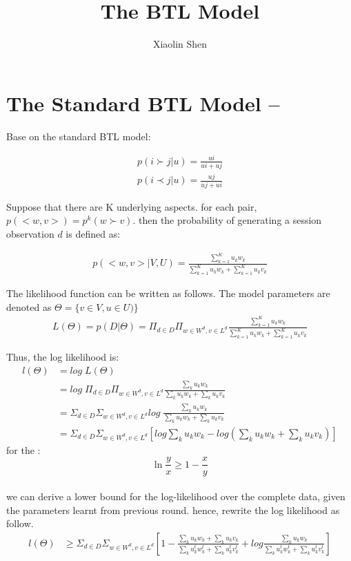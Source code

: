 \documentclass{article}
\title{The BTL Model}
\author{Xiaolin Shen}
\begin{document}
\maketitle


\section{The Standard BTL Model --}
Base on the standard BTL model:

\begin{align*}
	p(i \succ j |u)=\frac{ui}{ui+ uj} \\
	p(i \prec j |u)=\frac{uj}{uj+ ui}
\end{align*}

 Suppose that there are K underlying aspects. for each pair, $p(<w,v>) = p^k(w\succ v) $. then the probability of generating a session observation $d$ is defined as:

\begin{align}
p(<w,v>|V,U)
= \frac{\sum_{k=1}^{K} u_k w_k}{\sum_{k=1}^{K} u_k w_k+ \sum_{k=1}^{K} u_k v_k}
\end{align}

The likelihood function can be written as follows. The model parameters are denoted as $ \Theta = \{ v \in V ,u \in U ) \}$
\begin{align}
L(\Theta)=p(D|\Theta)
=\Pi_{d \in D} \Pi_{w\in W^d, v\in L^d} \frac{\sum_{k=1}^{K} u_k w_k}{\sum_{k=1}^{K} u_k w_k+ \sum_{k=1}^{K} u_k v_k}
\end{align}

Thus, the log likelihood is:
\begin{align}
l(\Theta) &= log \; L(\Theta) \\
& =log \; \Pi_{d \in D} \Pi_{w\in W^d, v\in L^d} \frac{\sum_k u_k w_k}{\sum_k u_k w_k+ \sum_k u_k v_k}\\ \nonumber
& =\Sigma_{d \in D} \Sigma_{w\in W^d, v\in L^d} log \;  \frac{\sum_k u_k w_k}{\sum_k u_k w_k+ \sum_k u_k v_k}\\ \nonumber
& =\Sigma_{d \in D} \Sigma_{w\in W^d, v\in L^d} [log \sum_k u_k w_k-log (\sum_k u_k w_k+ \sum_k u_k v_k)]
\end{align}
for the :
\begin{equation*}
\ln \frac{y}{x} \geq 1- \frac{x}{y}
\end{equation*}\\
we can derive a lower bound for the log-likelihood over the complete data, given the parameters learnt from previous round.
hence, rewrite the log likelihood as follow.
\begin{align}
l(\Theta)
& \geq\Sigma_{d \in D} \Sigma_{w\in W^d, v\in L^d} [1- \frac{\sum_k u_k w_k+ \sum_k u_k v_k}{\sum_k u_k^t w_k^t + \sum_k u_k^t v_k^t} + log \frac{\sum_k u_k w_k}{\sum_k u_k^t w_k^t + \sum_k u_k^t v_k^t}]
\end{align}
\end{document}
